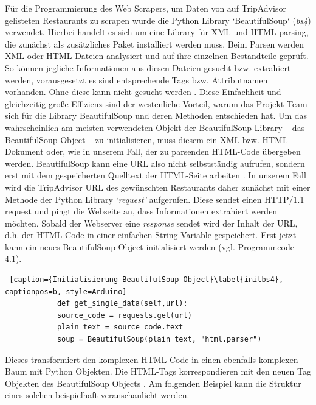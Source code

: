\documentclass[a4paper,oneside,12pt]{report}
\begin{document}
			Für die Programmierung des Web Scrapers, um Daten von auf TripAdvisor gelisteten Restaurants zu scrapen wurde die Python Library ‘BeautifulSoup‘ (\textit{bs4}) verwendet.
			\newline
			Hierbei handelt es sich um eine Library für XML und HTML parsing, die zunächst als zusätzliches Paket installiert werden muss. Beim Parsen werden XML oder HTML Dateien analysiert und auf ihre einzelnen Bestandteile geprüft. So können jegliche Informationen aus diesen Dateien gesucht bzw. extrahiert werden, vorausgesetzt es sind entsprechende Tags bzw. Attributnamen vorhanden. Ohne diese kann nicht gesucht werden \cite{bib-webpython}. Diese Einfachheit und gleichzeitig große Effizienz sind der westenliche Vorteil, warum das Projekt-Team sich für die Library BeautifulSoup und deren Methoden entschieden hat.
			\newline
			Um das wahrscheinlich am meisten verwendeten Objekt der BeautifulSoup Library – das BeautifulSoup Object – zu initialisieren, muss diesem ein XML bzw. HTML Dokument oder, wie in unserem Fall, der zu parsenden HTML-Code übergeben werden. BeautifulSoup kann eine URL also nicht selbstständig aufrufen, sondern erst mit dem gespeicherten Quelltext der HTML-Seite arbeiten \cite{bib-bs4}. In unserem Fall wird die TripAdvisor URL des gewünschten Restaurants daher zunächst mit einer Methode der Python Library \textit{‘request'} aufgerufen. Diese sendet einen HTTP/1.1 request und pingt die Webseite an, dass Informationen extrahiert werden möchten. Sobald der Webserver eine \textit{response} sendet wird der Inhalt der URL, d.h. der HTML-Code in einer einfachen String Variable gespeichert. Erst jetzt kann ein neues BeautifulSoup Object initialisiert werden (vgl. Programmcode 4.1).
			\begin{lstlisting} [caption={Initialisierung BeautifulSoup Object}\label{initbs4}, captionpos=b, style=Arduino]
			def get_single_data(self,url):
			source_code = requests.get(url)
			plain_text = source_code.text
			soup = BeautifulSoup(plain_text, "html.parser")
			\end{lstlisting}
			
			Dieses transformiert den komplexen HTML-Code in einen ebenfalls komplexen Baum mit Python Objekten. Die HTML-Tags korrespondieren mit den neuen Tag Objekten des BeautifulSoup Objects \cite{bib-bs4}. Am folgenden Beispiel kann die Struktur eines solchen beispielhaft veranschaulicht werden.
			
\end{document}
